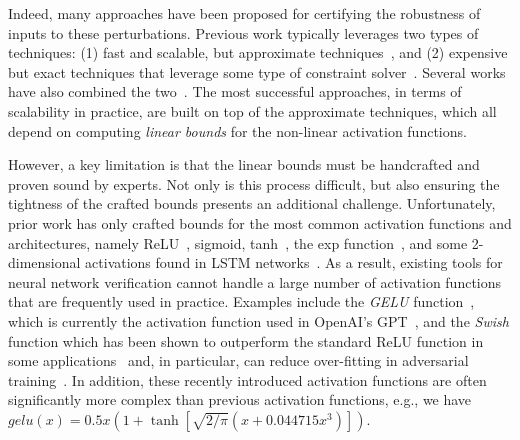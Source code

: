 Indeed, many approaches have been proposed for certifying the
robustness of inputs to these perturbations. Previous work typically
leverages two types of techniques: (1) fast and scalable, but approximate
techniques~\cite{SinghGPV19,GehrMDTCV18,WengZCSHDBD18,shi2020robustness,ko2019popqorn},
 and (2) expensive but exact techniques that leverage some type of
constraint
solver~\cite{KatzBDJK17,KatzHIJLLSTWZDK19,tjeng2019evaluating}. Several works
have also
combined the
two~\cite{SinghGPV19iclr,Singh2019krelu,WangPWYJ18nips,tran2019star}. The
most successful approaches, in terms of scalability in practice, are built on top of the approximate techniques, which
all depend on computing \textit{linear bounds} for the non-linear activation functions.



However, a key limitation is that the linear bounds must be handcrafted and
proven sound by experts. Not only is this process difficult, but also ensuring
the tightness of the crafted bounds presents an additional challenge.
Unfortunately, prior work has only crafted bounds for the most common
activation functions and architectures, namely ReLU~\cite{WangPWYJ18nips},
sigmoid, tanh~\cite{SinghGPV19,zhang2018efficient,wu2021tightening}, the exp
function~\cite{shi2020robustness}, and some
2-dimensional activations found in LSTM networks~\cite{ko2019popqorn}.
%
As a result, existing tools for neural network verification
cannot handle a large number of activation functions that are
frequently used in practice.  Examples include the \emph{GELU}
function~\cite{hendrycks2016gaussian}, which is currently the activation
function used in OpenAI's GPT~\cite{radford2018improving}, and the \emph{Swish}
function which has been shown to outperform the standard ReLU function in some
applications~\cite{ramachandran2017searching} and, in particular, can reduce
over-fitting in adversarial training~\cite{singla2021low}. In addition, these
recently introduced activation
functions are often significantly more complex than previous activation
functions, e.g., we have $
\mathit{gelu}(x) = 0.5 x ( 1 + \tanh{[ \sqrt{2 / \pi } (x + 0.044715x ^{3} ) ]
} )
$.
%

